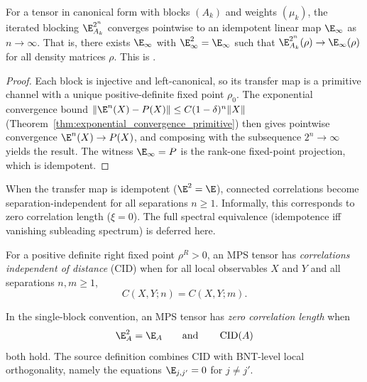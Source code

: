 \begin{theorem}%
    \label{thm:rg_flow_converges_of_cf}
    \leanok
    For a tensor in canonical form with blocks $(A_k)$ and weights $(\mu_k)$,
    the iterated blocking $\E_{A_k}^{2^n}$ converges pointwise to an
    idempotent linear map $\E_\infty$ as $n\to\infty$.
    That is, there exists $\E_\infty$ with $\E_\infty^2 = \E_\infty$ such that
    $\E_{A_k}^{2^n}(\rho) \to \E_\infty(\rho)$ for all density matrices $\rho$.
    This is \cite[Appendix~B]{Cirac2016MPDO_arXiv}.
\end{theorem}
\begin{proof}\leanok
    Each block is injective and left-canonical, so its transfer map is a
    primitive channel with a unique positive-definite fixed point $\rho_0$.
    The exponential convergence bound
    $\lVert \E^n(X) - P(X)\rVert \le C(1-\delta)^n \lVert X\rVert$
    (Theorem~\ref{thm:exponential_convergence_primitive}) then gives
    pointwise convergence $\E^n(X)\to P(X)$, and composing with the
    subsequence $2^n\to\infty$ yields the result.
    The witness $\E_\infty = P$ is the rank-one fixed-point projection,
    which is idempotent.
\end{proof}

\begin{remark}\label{rem:zero_correlation_length}
    When the transfer map is idempotent ($\E^2=\E$), connected correlations become
    separation-independent for all separations $n \ge 1$.
    Informally, this corresponds to zero correlation length ($\xi=0$).
    The full spectral equivalence (idempotence iff vanishing subleading spectrum)
    is deferred here.
\end{remark}

\begin{definition}\label{def:is_cid}
    \leanok
    For a positive definite right fixed point $\rho^R > 0$, an MPS tensor has
    \emph{correlations independent of distance} (CID) when for all local
    observables $X$ and $Y$ and all separations $n,m \ge 1$,
    \[
        C(X,Y;n) = C(X,Y;m).
    \]
\end{definition}

\begin{definition}\label{def:is_zcl}
    \leanok
    In the single-block convention, an MPS tensor has \emph{zero correlation
    length} when
    \[
        \E_A^2=\E_A
        \qquad\text{and}\qquad
        \operatorname{CID}(A)
    \]
    both hold. The source definition combines CID with BNT-level local
    orthogonality, namely the equations $\E_{j,j'}=0$ for $j\ne j'$.
\end{definition}

